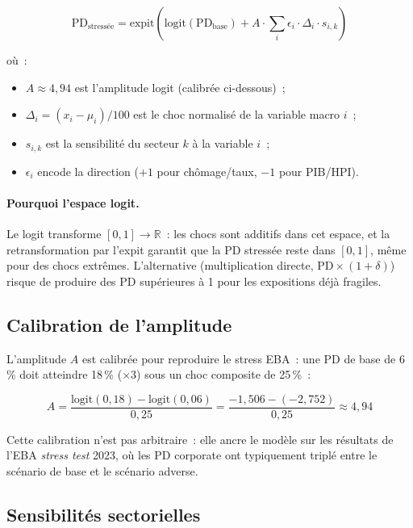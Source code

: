 \documentclass[12pt, a4paper, twoside, openright]{report}
\theoremstyle{definition}
\begin{document}
\begin{equation}
\text{PD}_{\text{stressée}} = \text{expit}\!\left(\text{logit}(\text{PD}_{\text{base}}) + A \cdot \sum_i \epsilon_i \cdot \Delta_i \cdot s_{i,k}\right)
\label{eq:pd-stress}
\end{equation}

\noindent où~:
\begin{itemize}[nosep]
  \item $A \approx 4{,}94$ est l'amplitude logit (calibrée ci-dessous)~;
  \item $\Delta_i = (x_i - \mu_i)/100$ est le choc normalisé de la variable macro $i$~;
  \item $s_{i,k}$ est la sensibilité du secteur $k$ à la variable $i$~;
  \item $\epsilon_i$ encode la direction ($+1$ pour chômage/taux, $-1$ pour PIB/HPI).
\end{itemize}

\paragraph{Pourquoi l'espace logit.} Le logit transforme $[0, 1] \to \mathbb{R}$~: les chocs sont additifs dans cet espace, et la retransformation par l'expit garantit que la PD stressée reste dans $[0, 1]$, même pour des chocs extrêmes. L'alternative (multiplication directe, $\text{PD} \times (1 + \delta)$) risque de produire des PD supérieures à 1 pour les expositions déjà fragiles.

\subsection{Calibration de l'amplitude}

L'amplitude $A$ est calibrée pour reproduire le stress EBA~: une PD de base de 6\,\% doit atteindre 18\,\% ($\times 3$) sous un choc composite de 25\,\%~:

\begin{equation}
A = \frac{\text{logit}(0{,}18) - \text{logit}(0{,}06)}{0{,}25} = \frac{-1{,}506 - (-2{,}752)}{0{,}25} \approx 4{,}94
\label{eq:amplitude}
\end{equation}

Cette calibration n'est pas arbitraire~: elle ancre le modèle sur les résultats de l'EBA \emph{stress test} 2023, où les PD corporate ont typiquement triplé entre le scénario de base et le scénario adverse.

\subsection{Sensibilités sectorielles}
\end{document}
